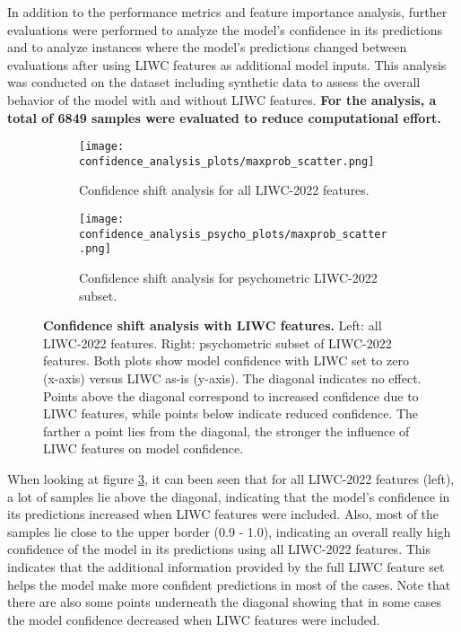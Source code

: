 In addition to the performance metrics and feature importance analysis, further evaluations were performed to analyze the model's confidence in its predictions and to analyze instances where the model's predictions changed between evaluations after using LIWC features as additional model inputs. This analysis was conducted on the dataset including synthetic data to assess the overall behavior of the model with and without LIWC features. \textbf{For the analysis, a total of 6849 samples were evaluated to reduce computational effort.}

\begin{figure}[H]
  \centering
  
  \begin{subfigure}[t]{0.49\textwidth}
    \centering
    \texttt{[image: confidence\_analysis\_plots/maxprob\_scatter.png]}
    \caption{Confidence shift analysis for all LIWC-2022 features.}
    \label{fig:confshift_all}
  \end{subfigure}\hfill
  \begin{subfigure}[t]{0.49\textwidth}
    \centering
    \texttt{[image: confidence\_analysis\_psycho\_plots/maxprob\_scatter.png]}
    \caption{Confidence shift analysis for psychometric LIWC-2022 subset.}
    \label{fig:confshift_psycho}
  \end{subfigure}

  \caption[Confidence shift analysis with LIWC features.]{\textbf{Confidence shift analysis with LIWC features.} 
  Left: all LIWC-2022 features. Right: psychometric subset of LIWC-2022 features. 
  Both plots show model confidence with LIWC set to zero (x-axis) versus LIWC as-is (y-axis). 
  The diagonal indicates no effect. 
  Points above the diagonal correspond to increased confidence due to LIWC features, while points below indicate reduced confidence. 
  The farther a point lies from the diagonal, the stronger the influence of LIWC features on model confidence. }
  \label{fig:confidence_shift}

\end{figure}

When looking at figure \ref{fig:confidence_shift}, it can been seen that for all LIWC-2022 features (left), a lot of samples lie above the diagonal, indicating that the model's confidence in its predictions increased when LIWC features were included. Also, most of the samples lie close to the upper border (0.9 - 1.0), indicating an overall really high confidence of the model in its predictions using all LIWC-2022 features.
This indicates that the additional information provided by the full LIWC feature set helps the model make more confident predictions in most of the cases. Note that there are also some points underneath the diagonal showing that in some cases the model confidence decreased when LIWC features were included. 

